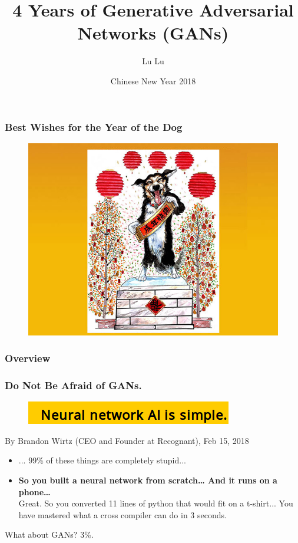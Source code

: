 \documentclass{beamer}
\title[4 years of GANs]{4 Years of Generative Adversarial Networks (GANs)}
\author{Lu Lu}
\institute[Crunch]{Crunch Seminar}
\date{Chinese New Year 2018}
\begin{document}
\frame{\titlepage}

\begin{frame}
\frametitle{Best Wishes for the Year of the Dog}
\begin{figure}
  \includegraphics[height=.85\textheight]{happy_new_year.jpg}
\end{figure}
\end{frame}

\begin{frame}
\frametitle{Overview}
\tableofcontents
\end{frame}

\begin{frame}
\frametitle{Do Not Be Afraid of GANs.}
\begin{figure}
  \includegraphics[width=.8\textwidth]{AI_simple.png}
\end{figure}
\hfill By Brandon Wirtz (CEO and Founder at Recognant), Feb 15, 2018\\
\begin{itemize}
\item ... 99\% of these things are completely stupid...
\item \textbf{So you built a neural network from scratch… And it runs on a phone…} \\
Great. So you converted 11 lines of python that would fit on a t-shirt... You have mastered what a cross compiler can do in 3 seconds.
\end{itemize}
What about GANs? 3\%.
\end{frame}
\end{document}
